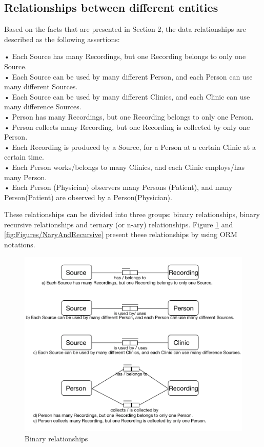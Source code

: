 \subsection{Relationships between different entities}
Based on the facts that are presented in Section 2, the data relationships are described as the following assertions:
\begin{adjustwidth}{1cm}{}
•	Each Source has many Recordings, but one Recording belongs to only one Source.\\
•	Each Source can be used by many different Person, and each Person can use many different Sources.\\
•	Each Source can be used by many different Clinics, and each Clinic can use many difference Sources.\\
•	Person has many Recordings, but one Recording belongs to only one Person.\\
•	Person collects many Recording, but one Recording is collected by only one Person.\\
•	Each Recording is produced by a Source, for a Person at a certain Clinic at a certain time.\\
•	Each Person works/belongs to many Clinics, and each Clinic employs/has many Person.\\
•	Each Person (Physician) observers many Persons (Patient), and many Person(Patient) are observed by a Person(Physician).
\end{adjustwidth}
These relationships can be divided into three groups: binary relationships, binary recursive relationships and ternary (or n-ary) relationships. Figure \ref{fig:Figures/RelationshipBinary} and \ref{fig:Figures/NaryAndRecursive} present these relationships by using ORM notations.\\
\begin{figure}[ht]
    \centering
    \includegraphics[width=1.0\textwidth]{Figures/RelationshipBinary.png}
    \caption{Binary relationships}
    \label{fig:Figures/RelationshipBinary}
\end{figure}
